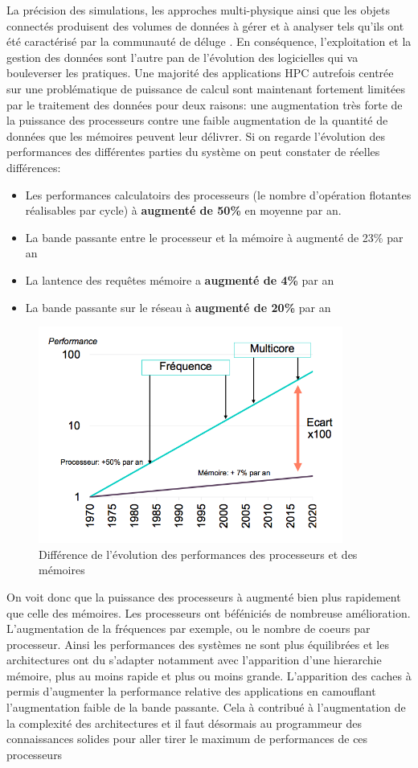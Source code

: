 La précision des simulations, les approches multi-physique ainsi que les objets connectés produisent des volumes de données à gérer et à analyser tels qu’ils ont été caractérisé par la communauté de déluge \cite{bodin:hal-01174302}. En conséquence, l’exploitation et la gestion des données sont l’autre pan de l’évolution des logicielles qui va bouleverser les pratiques. Une majorité des applications HPC autrefois centrée sur une problématique de puissance de calcul sont maintenant fortement limitées par le traitement des données pour deux raisons: une augmentation très forte de la puissance des processeurs contre une faible augmentation de la quantité de données que les mémoires peuvent leur délivrer. Si on regarde l'évolution des performances des différentes parties du système on peut constater de réelles différences:
\begin{itemize}
    \item Les performances calculatoirs des processeurs (le nombre d'opération flotantes réalisables par cycle) à \textbf{augmenté de 50\%} en moyenne par an.
    \item La bande passante entre le processeur et la mémoire à augmenté de 23\% par an
    \item La lantence des requêtes mémoire a \textbf{augmenté de 4\% }par an
    \item La bande passante sur le réseau à \textbf{augmenté de 20\%} par an
\end{itemize}

\begin{figure}
    \center
    \includegraphics[width=10cm]{images/Chapitre1/memory_gap.png}
    \caption{\label{pic_memory_gap} Différence de l'évolution des performances des processeurs et des mémoires }
\end{figure}

On voit donc que la puissance des processeurs à augmenté bien plus rapidement que celle des mémoires. Les processeurs ont béféniciés de nombreuse amélioration. L'augmentation de la fréquences par exemple, ou le nombre de coeurs par processeur. Ainsi les performances des systèmes ne sont plus équilibrées et les architectures ont du s'adapter notamment avec l'apparition d'une hierarchie mémoire, plus au moins rapide et plus ou moins grande. L'apparition des caches à permis d'augmenter la performance relative des applications en camouflant l'augmentation faible de la bande passante. Cela à contribué à l'augmentation de la complexité des architectures et il faut désormais au programmeur des connaissances solides pour aller tirer le maximum de performances de ces processeurs

